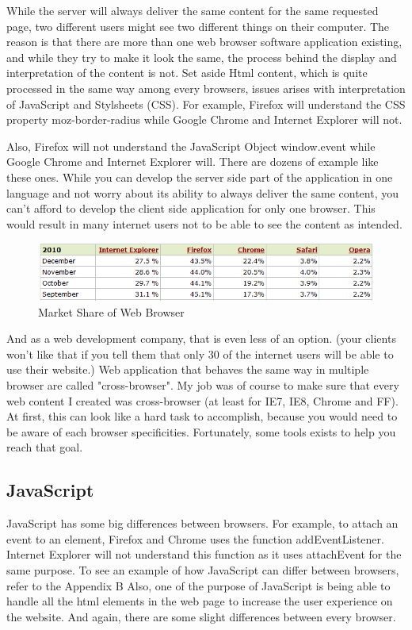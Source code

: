 While the server will always deliver the same content for the same requested page, two different users might see two different things on their computer. 
The reason is that there are more than one web browser software application existing, and while they try to make it look the same, the process behind the display and interpretation of the content is not. Set aside Html content, which is quite processed in the same way among every browsers, issues arises with interpretation of
JavaScript and Stylsheets (CSS). For example, Firefox will understand the CSS property moz-border-radius while Google Chrome and Internet Explorer will not. 

Also, Firefox will not understand the JavaScript Object window.event while Google Chrome and Internet Explorer will. There are dozens of example like these ones.
While you can develop the server side part of the application in one language and not worry about its ability to always deliver the same content, you can't afford to develop the client side application for only one browser. This would result in many internet users not to be able to see the content as intended.

\begin{figure}[!ht]
\centering
\includegraphics[width=.55\textwidth]{img/browser_statistics.png}
\caption{Market Share of Web Browser}
\label{figure:market-brosers}
\end{figure}

And as a web development company, that is even less of an option. (your clients won't like that if you tell them that only 30 of the internet users will be able to use their website.)
Web application that behaves the same way in multiple browser are called "cross-browser". 
My job was of course to make sure that every web content I created was cross-browser (at least for IE7, IE8, Chrome and FF).
At first, this can look like a hard task to accomplish, because you would need to be aware of each browser specificities. Fortunately, some tools exists to help you reach that goal.

\subsection{JavaScript}

JavaScript has some big differences between browsers. For example, to attach an event to an element, Firefox and Chrome uses the function addEventListener. Internet Explorer will not understand this function as it uses attachEvent for the same purpose. To see an example of how JavaScript can differ between browsers, refer to the Appendix B
Also, one of the purpose of JavaScript is being able to handle all the html elements in the web page to increase the user experience on the website. And again, there are some slight differences between every browser.

